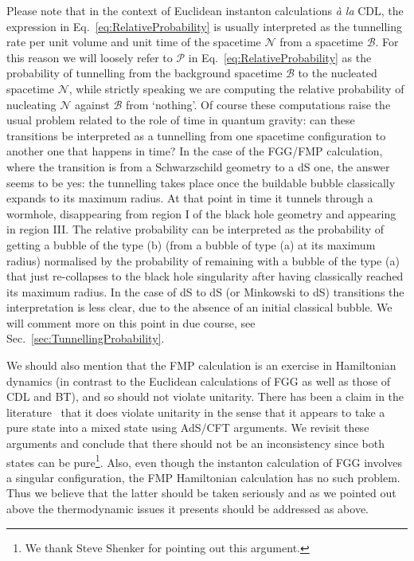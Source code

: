 \documentclass[11pt,a4paper]{article}
\begin{document}
Please note that in the context of Euclidean instanton calculations \textit{à la} CDL, the expression in Eq.~\eqref{eq:RelativeProbability} is usually interpreted as the tunnelling rate per unit volume and unit time of the spacetime $\mathcal{N}$ from a spacetime $\mathcal{B}$. For this reason we will loosely refer to $\mathcal{P}$ in Eq.~\eqref{eq:RelativeProbability} as the probability of tunnelling from the background spacetime $\mathcal{B}$ to the nucleated spacetime $\mathcal{N}$, while strictly speaking we are computing the relative probability of nucleating $\mathcal{N}$ against $\mathcal{B}$ from `nothing'. Of course these computations raise the usual problem related to the role of time in quantum gravity: can these transitions be interpreted as a tunnelling from one spacetime configuration to another one that happens in time? In the case of the FGG/FMP calculation, where the transition is from a Schwarzschild geometry to a dS one, the answer seems to be yes: the tunnelling takes place once the buildable bubble classically expands to its maximum radius. At that point in time it tunnels through a wormhole, disappearing from region I of the black hole geometry and appearing in region III. The relative probability can be interpreted as the probability of getting a bubble of the type (b) (from a bubble of type (a) at its maximum radius) normalised by the probability of remaining with a bubble of the type (a) that just re-collapses to the black hole singularity after having classically reached its maximum radius. In the case of dS to dS (or Minkowski to dS) transitions the interpretation is less clear, due to the absence of an initial classical bubble. We will comment more on this point in due course, see Sec.~\ref{sec:TunnellingProbability}.

We should also mention that the FMP calculation is an exercise in Hamiltonian dynamics (in contrast to the Euclidean calculations of FGG as well as those of CDL and BT), and so should not violate unitarity. There has been a claim in the literature~\cite{Freivogel:2005qh} that it does violate unitarity in the sense that it appears to take a pure state into a mixed state using AdS/CFT arguments. We revisit these arguments and conclude that there should not be an inconsistency since both states can be pure\footnote{We thank Steve Shenker for pointing out this argument.}. Also, even though the instanton calculation of FGG involves a singular configuration, the FMP Hamiltonian calculation has no such problem. Thus we believe that the latter should be taken seriously and as we pointed out above the thermodynamic issues it presents should be addressed as above.
\end{document}
